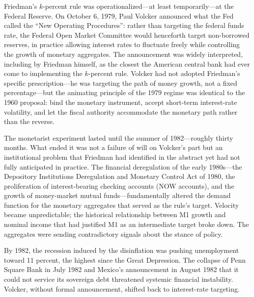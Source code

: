 \documentclass[12pt]{article}
\begin{document}
Friedman's $k$-percent rule was 
operationalized---at least temporarily---at the Federal Reserve.  On October 6, 1979,
Paul Volcker announced what the Fed called the ``New Operating
Procedures'': rather than targeting the federal funds rate, the Federal
Open Market Committee would henceforth target non-borrowed reserves,
in practice allowing interest rates to fluctuate freely while controlling
the growth of monetary aggregates.  The announcement was widely
interpreted, including by Friedman himself, as the closest the American
central bank had ever come to implementing the $k$-percent rule.
Volcker had not adopted Friedman's specific prescription---he was
targeting the path of money growth, not a fixed percentage---but the
animating principle of the 1979 regime was identical to the 1960
proposal: bind the monetary instrument, accept short-term
interest-rate volatility, and let the fiscal authority accommodate the
monetary path rather than the reverse.

The monetarist experiment lasted until the summer of 1982---roughly
thirty months.  What ended it was not a failure of will on Volcker's
part but an institutional problem that Friedman had identified in the
abstract yet had not fully anticipated in practice.  The financial
deregulation of the early 1980s---the Depository Institutions
Deregulation and Monetary Control Act of 1980, the proliferation of
interest-bearing checking accounts (NOW accounts), and the growth of
money-market mutual funds---fundamentally altered the demand function for
the monetary aggregates that served as the rule's target.  Velocity
became unpredictable; the historical relationship between M1 growth and
nominal income that had justified M1 as an intermediate target broke
down.  The aggregates were sending contradictory signals about the stance
of policy.

By 1982, the recession induced by the disinflation was pushing
unemployment toward 11 percent, the highest since the Great Depression.
The collapse of Penn Square Bank in July 1982 and Mexico's announcement
in August 1982 that it could not service its sovereign debt threatened
systemic financial instability.  Volcker, without formal announcement,
shifted back to interest-rate targeting.
\end{document}
